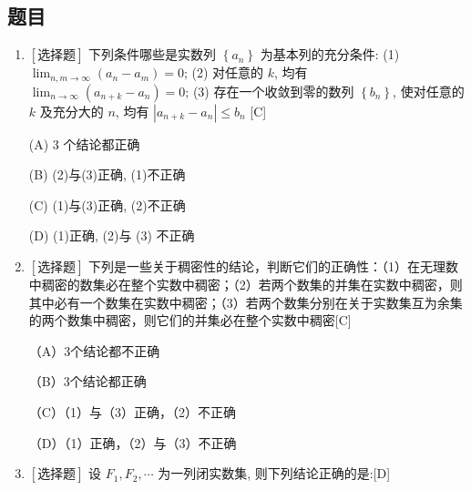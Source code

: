 \documentclass{article}
\begin{document}
\subsection{题目}
\begin{enumerate}
    \item $\left[\textbf{选择题}\right]$ 下列条件哪些是实数列 $\left\{a_n\right\}$ 为基本列的充分条件: (1) $\lim _{n, m\to \infty}\left(a_n-a_m\right)=0$; (2) 对任意的 $k$, 均有 $\lim _{n \to \infty}\left(a_{n+k}-a_n\right)=0$; (3) 存在一个收敛到零的数列 $\left\{b_n\right\}$, 使对任意的 $k$ 及充分大的 $n$, 均有 $\left|a_{n+k}-a_n\right| \leq b_n$ \hfill[C]
    
    \begin{minipage}[t]{0.45\linewidth}
    (A) 3 个结论都正确
    \end{minipage}
    \hfill
    \begin{minipage}[t]{0.45\linewidth}
    (B) (2)与(3)正确, (1)不正确
    \end{minipage}
    \begin{minipage}[t]{0.45\linewidth}
    (C) (1)与(3)正确, (2)不正确
    \end{minipage}
    \hfill
    \begin{minipage}[t]{0.45\linewidth}
    (D) (1)正确, (2)与 (3) 不正确
    \end{minipage}

    \item $\left[\textbf{选择题}\right]$ 下列是一些关于稠密性的结论，判断它们的正确性：（1）在无理数中稠密的数集必在整个实数中稠密；（2）若两个数集的并集在实数中稠密，则其中必有一个数集在实数中稠密；（3）若两个数集分别在关于实数集互为余集的两个数集中稠密，则它们的并集必在整个实数中稠密\hfill[C]

    \begin{minipage}[t]{0.45\linewidth}
    （A）3个结论都不正确
    \end{minipage}
    \hfill
    \begin{minipage}[t]{0.45\linewidth}
    （B）3个结论都正确
    \end{minipage}
    \begin{minipage}[t]{0.45\linewidth}
    （C）（1）与（3）正确，（2）不正确
    \end{minipage}
    \hfill
    \begin{minipage}[t]{0.45\linewidth}
    （D）（1）正确，（2）与（3）不正确
    \end{minipage}

    \item $\left[\textbf{选择题}\right]$ 设 $F_1, F_2, \cdots$ 为一列闭实数集, 则下列结论正确的是:\hfill[D]
    

\end{enumerate}
\end{document}
